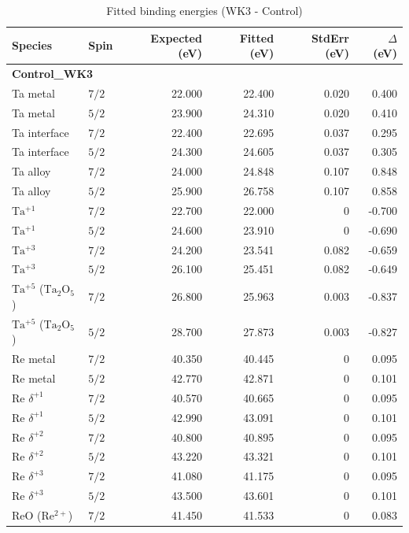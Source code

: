 \documentclass[12pt]{article}
\begin{document}
\begin{table}[H]
\centering
\begin{threeparttable}
\caption{Fitted binding energies (WK3 - Control)}
\begin{tabular}{llrrrr}
\toprule
Species & Spin & Expected (eV) & Fitted (eV) & StdErr (eV) & $\Delta$ (eV) \\
\midrule
\multicolumn{6}{l}{\textbf{Control\_WK3}} \\
Ta metal & $7/2$ & 22.000 & 22.400 & 0.020 & 0.400 \\
Ta metal & $5/2$ & 23.900 & 24.310 & 0.020 & 0.410 \\
Ta interface & $7/2$ & 22.400 & 22.695 & 0.037 & 0.295 \\
Ta interface & $5/2$ & 24.300 & 24.605 & 0.037 & 0.305 \\
Ta alloy & $7/2$ & 24.000 & 24.848 & 0.107 & 0.848 \\
Ta alloy & $5/2$ & 25.900 & 26.758 & 0.107 & 0.858 \\
$\mathrm{Ta^{+1}}$ & $7/2$ & 22.700 & 22.000 & 0 & -0.700 \\
$\mathrm{Ta^{+1}}$ & $5/2$ & 24.600 & 23.910 & 0 & -0.690 \\
$\mathrm{Ta^{+3}}$ & $7/2$ & 24.200 & 23.541 & 0.082 & -0.659 \\
$\mathrm{Ta^{+3}}$ & $5/2$ & 26.100 & 25.451 & 0.082 & -0.649 \\
$\mathrm{Ta^{+5}}$ ($\mathrm{Ta_2O_5}$) & $7/2$ & 26.800 & 25.963 & 0.003 & -0.837 \\
$\mathrm{Ta^{+5}}$ ($\mathrm{Ta_2O_5}$) & $5/2$ & 28.700 & 27.873 & 0.003 & -0.827 \\
Re metal & $7/2$ & 40.350 & 40.445 & 0 & 0.095 \\
Re metal & $5/2$ & 42.770 & 42.871 & 0 & 0.101 \\
$\mathrm{Re}$ $\delta^{+1}$ & $7/2$ & 40.570 & 40.665 & 0 & 0.095 \\
$\mathrm{Re}$ $\delta^{+1}$ & $5/2$ & 42.990 & 43.091 & 0 & 0.101 \\
$\mathrm{Re}$ $\delta^{+2}$ & $7/2$ & 40.800 & 40.895 & 0 & 0.095 \\
$\mathrm{Re}$ $\delta^{+2}$ & $5/2$ & 43.220 & 43.321 & 0 & 0.101 \\
$\mathrm{Re}$ $\delta^{+3}$ & $7/2$ & 41.080 & 41.175 & 0 & 0.095 \\
$\mathrm{Re}$ $\delta^{+3}$ & $5/2$ & 43.500 & 43.601 & 0 & 0.101 \\
$\mathrm{ReO}$ ($\mathrm{Re^{2+}}$) & $7/2$ & 41.450 & 41.533 & 0 & 0.083 \\

\end{tabular}
\end{threeparttable}
\end{table}
\end{document}
